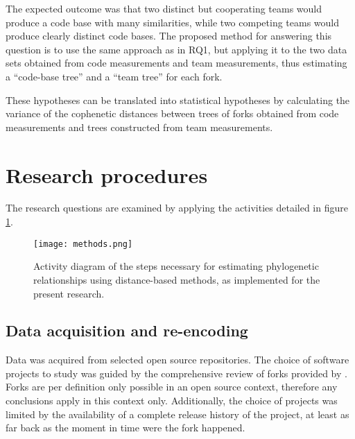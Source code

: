 The expected outcome was that two distinct but cooperating teams would produce a code base with many similarities, while two competing teams would produce clearly distinct code bases. The proposed method for answering this question is to use the same approach as in RQ1, but applying it to the two data sets obtained from code measurements and team measurements, thus estimating a “code-base tree” and a “team tree” for each fork. 



\noindent
These hypotheses can be translated into statistical hypotheses by calculating the variance of the cophenetic distances between trees of forks obtained from code measurements and trees constructed from team measurements.



\section{Research procedures}
The research questions are examined by applying the activities detailed in figure \ref{fig:methods}.

\begin{figure}[H]
  \centering
  \texttt{[image: methods.png]}
  \caption{Activity diagram of the steps necessary for estimating phylogenetic relationships using distance-based methods, as implemented for the present research.}
  \label{fig:methods}
\end{figure}

\subsection{Data acquisition and re-encoding}
Data was acquired from selected open source repositories. The choice of software projects to study was guided by the comprehensive review of forks provided by \citet{Robles2012a}. Forks are per definition only possible in an open source context, therefore any conclusions apply in this context only. Additionally, the choice of projects was limited by the availability of a complete release history of the project, at least as far back as the moment in time were the fork happened.

